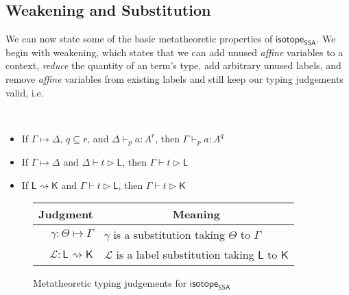 \documentclass[acmsmall,screen,review]{acmart}
\newcommand{\mc}[1]{\ensuremath{\mathcal{#1}}}
\newcommand{\ms}[1]{\ensuremath{\mathsf{#1}}}
\newcommand{\cwk}[2]{#1 \mapsto #2}
\newcommand{\lwk}[2]{#1 \rightsquigarrow #2}
\newcommand{\hasty}[5]{#1 \vdash_{#2} #3: {#4}^{#5}}
\newcommand{\haslb}[3]{#1 \vdash #2 \rhd #3}
\newcommand{\lhaslb}[3]{#1 \vdash #2 \rhd #3}
\newcommand{\issubst}[3]{#1: #2 \mapsto #3}
\newcommand{\lbsubst}[3]{#1: #2 \rightsquigarrow #3}
\newcommand{\isotopessa}{\ms{isotope_{SSA}}}
\begin{document}
\subsection{Weakening and Substitution}

We can now state some of the basic metatheoretic properties of \isotopessa. We
begin with weakening, which states that we can add unused \textit{affine} variables to a context,
\textit{reduce} the quantity of an term's type, add arbitrary unused labels, and
remove \textit{affine} variables from existing labels and still keep our typing
judgements valid, i.e.
\begin{lemma}[Weakening] \
  \begin{itemize}
    \item If \(\cwk{\Gamma}{\Delta}\), \(q \subseteq r\), and
    \(\hasty{\Delta}{p}{a}{A}{r}\), then \(\hasty{\Gamma}{p}{a}{A}{q}\)
    \item If \(\cwk{\Gamma}{\Delta}\) and \(\haslb{\Delta}{t}{\ms{L}}\), then
    \(\haslb{\Gamma}{t}{\ms{L}}\)
    \item If \(\lwk{\ms{L}}{\ms{K}}\) and \(\haslb{\Gamma}{t}{\ms{L}}\), then \(\haslb{\Gamma}{t}{\ms{K}}\)
  \end{itemize}
\end{lemma}

\begin{figure}
  \begin{center}        
    \begingroup
    \renewcommand{\arraystretch}{1.5}
    \setlength{\tabcolsep}{2em}
    \begin{tabular}{rl}
        \multicolumn{1}{c}{Judgment} & \multicolumn{1}{c}{Meaning} \\ \hline
        \(\issubst{\gamma}{\Theta}{\Gamma}\) &
        \(\gamma\) is a substitution taking \(\Theta\) to \(\Gamma\) \\
        \(\lbsubst{\mc{L}}{\ms{L}}{\ms{K}}\) &
        \(\mc{L}\) is a label substitution taking \(\ms{L}\) to \(\ms{K}\)
    \end{tabular}
    \endgroup
  \end{center}
  \caption{Metatheoretic typing judgements for \isotopessa}
  \label{fig:ssa-meta-judgements}
\end{figure}
\end{document}
